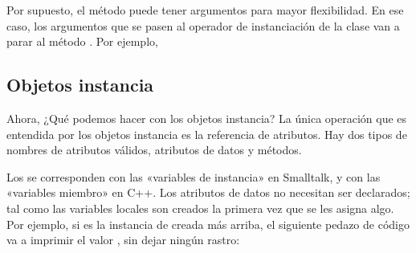 \documentclass[a4,10pt,spanish]{sphinxmanual}
\begin{document}
\sphinxAtStartPar
Por supuesto, el método  puede tener argumentos para mayor flexibilidad.  En ese caso, los argumentos que se pasen al operador de instanciación de la clase van a parar al método .  Por ejemplo,

\begin{sphinxVerbatim}[commandchars=\\\{\}]
 
       
          
          
   
 
\end{sphinxVerbatim}


\subsection{Objetos instancia}
\label{\detokenize{tutorial/classes:instance-objects}}\label{\detokenize{tutorial/classes:tut-instanceobjects}}
\sphinxAtStartPar
Ahora, ¿Qué podemos hacer con los objetos instancia?  La única operación que es entendida por los objetos instancia es la referencia de atributos.  Hay dos tipos de nombres de atributos válidos, atributos de datos y métodos.

\sphinxAtStartPar
Los  se corresponden con las «variables de instancia» en Smalltalk, y con las «variables miembro» en C++.  Los atributos de datos no necesitan ser declarados; tal como las variables locales son creados la primera vez que se les asigna algo.  Por ejemplo, si  es la instancia de  creada más arriba, el siguiente pedazo de código va a imprimir el valor , sin dejar ningún rastro:

\begin{sphinxVerbatim}[commandchars=\\\{\}]
  
   
        
 
\end{sphinxVerbatim}
\end{document}
